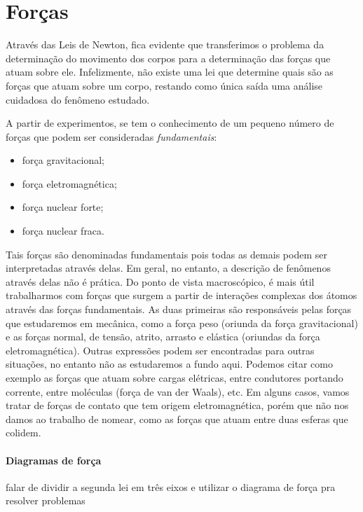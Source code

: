 \section{Forças}

Através das Leis de Newton, fica evidente que transferimos o problema da determinação do movimento dos corpos para a determinação das forças que atuam sobre ele. Infelizmente, não existe uma lei que determine quais são as forças que atuam sobre um corpo, restando como única saída uma análise cuidadosa do fenômeno estudado.

A partir de experimentos, se tem o conhecimento de um pequeno número de forças que podem ser consideradas \emph{fundamentais}:
\begin{itemize}
  \item força gravitacional;
  \item força eletromagnética;
  \item força nuclear forte;
  \item força nuclear fraca.
\end{itemize}
%
Tais forças são denominadas fundamentais pois todas as demais podem ser interpretadas através delas. Em geral, no entanto, a descrição de fenômenos através delas não é prática. Do ponto de vista macroscópico, é mais útil trabalharmos com forças que surgem a partir de interações complexas dos átomos através das forças fundamentais. As duas primeiras são responsáveis pelas forças que estudaremos em mecânica, como a força peso (oriunda da força gravitacional) e as forças normal, de tensão, atrito, arrasto e elástica (oriundas da força eletromagnética). Outras expressões podem ser encontradas para outras situações, no entanto não as estudaremos a fundo aqui. Podemos citar como exemplo as forças que atuam sobre cargas elétricas, entre condutores portando corrente, entre moléculas (força de van der Waals), etc. Em alguns casos, vamos tratar de forças de contato que tem origem eletromagnética, porém que não nos damos ao trabalho de nomear, como as forças que atuam entre duas esferas que colidem.

\paragraph{Diagramas de força} 

falar de dividir a segunda lei em três eixos e utilizar o diagrama de força pra resolver problemas


